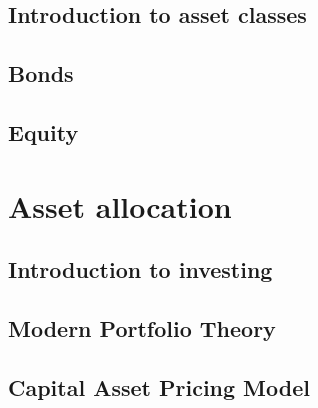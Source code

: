 \documentclass[letterpaper,10pt,italian]{jupyterBook}
\begin{document}
\sphinxstepscope


\chapter{Introduction to asset classes}
\label{\detokenize{ch/assets/intro:introduction-to-asset-classes}}\label{\detokenize{ch/assets/intro:fin-edu-assets-intro}}\label{\detokenize{ch/assets/intro::doc}}
\sphinxstepscope


\chapter{Bonds}
\label{\detokenize{ch/assets/bonds:bonds}}\label{\detokenize{ch/assets/bonds:fin-edu-assets-bonds}}\label{\detokenize{ch/assets/bonds::doc}}
\sphinxstepscope


\chapter{Equity}
\label{\detokenize{ch/assets/equity:equity}}\label{\detokenize{ch/assets/equity:fin-edu-assets-equity}}\label{\detokenize{ch/assets/equity::doc}}
\sphinxstepscope


\part{Asset allocation}

\sphinxstepscope


\chapter{Introduction to investing}
\label{\detokenize{ch/investing/intro:introduction-to-investing}}\label{\detokenize{ch/investing/intro:fin-edu-investing-intro}}\label{\detokenize{ch/investing/intro::doc}}
\sphinxstepscope


\chapter{Modern Portfolio Theory}
\label{\detokenize{ch/investing/mpt:modern-portfolio-theory}}\label{\detokenize{ch/investing/mpt:fin-edu-investing-mpt}}\label{\detokenize{ch/investing/mpt::doc}}
\sphinxstepscope


\chapter{Capital Asset Pricing Model}
\label{\detokenize{ch/investing/capm:capital-asset-pricing-model}}\label{\detokenize{ch/investing/capm:fin-edu-investing-capm}}\label{\detokenize{ch/investing/capm::doc}}






\renewcommand{\indexname}{Indice}
\printindex
\end{document}
